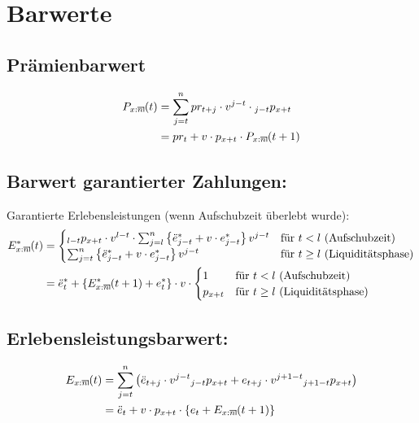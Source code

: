 \documentclass[a4paper,10pt]{article}
\makeatletter
\newcommand{\xn}{{\act[x]{n}}}
\DeclareRobustCommand{\act}[2][]{%
\def\arraystretch{0}%
\setlength\arraycolsep{0.5pt}%
\setlength\arrayrulewidth{0.5pt}%
\setbox0=\hbox{$\scriptstyle#1\ifx#1\empty{asdf}\else:\fi#2$}%
\begin{array}[b]{*2{@{}>{\scriptstyle}c}|}
\cline{2-2}%
\rule[1.25pt]{0pt}{\ht0}%
#1\ifx#1\empty\else:\fi & #2%
\end{array}%
}
\makeatother
\begin{document}
\pagebreak

\section{Barwerte}

\subsection{Prämienbarwert}

\begin{align*} 
P_\xn(t) &= \sum_{j=t}^n pr_{t+j} \cdot v^{j-t}  \cdot {}_{j-t}p_{x+t}\\
	  &= pr_{t} + v \cdot p_{x+t} \cdot P_\xn(t+1)
\end{align*}

\subsection{Barwert garantierter Zahlungen:}
Garantierte Erlebensleistungen (wenn Aufschubzeit überlebt wurde):
\begin{align*} 
 E^{*}_\xn(t) &= \begin{cases}
		    {}_{l-t}p_{x+t} \cdot v^{l-t} \cdot \sum_{j=l}^{n} \left\{\ddot{e}^{*}_{j-t}+ v\cdot e^*_{j-t}\right\} v^{j-t} & \text{für $t<l$ (Aufschubzeit)}\\
		    \sum_{j=t}^{n} \left\{\ddot{e}^{*}_{j-t}+ v\cdot e^*_{j-t}\right\} v^{j-t} & \text{für $t\ge l$ (Liquiditätsphase)}
                 \end{cases}\\
   &= \ddot{e}_t^{*} + \left\{E^{*}_\xn(t+1) + e_t^*\right\}\cdot v \cdot \begin{cases}
	    1 & \text{für $t<l$ (Aufschubzeit)}\\
            p_{x+t} & \text{für $t\ge l$ (Liquiditätsphase)}
       \end{cases}
\end{align*}


\subsection{Erlebensleistungsbarwert:}
\begin{align*} 
E_\xn(t) &= \sum_{j=t}^n \left(\ddot{e}_{t+j} \cdot v^{j-t}  {}_{j-t}p_{x+t} + e_{t+j} \cdot v^{j+1-t} {}_{j+1-t}p_{x+t} \right)\\
	  &= \ddot{e}_{t} + v \cdot p_{x+t} \cdot \left\{ e_t + E_\xn(t+1)\right\}\\
\end{align*}
\end{document}
